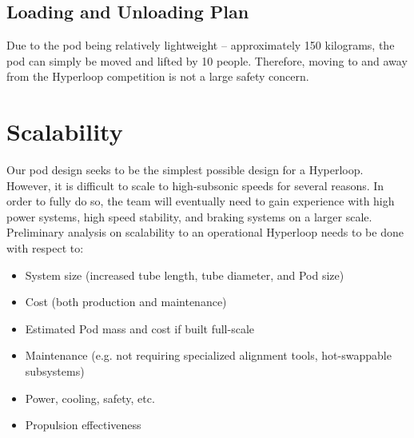 \documentclass[main.tex]{subfiles}
\begin{document}
\subsection{Loading and Unloading Plan}
Due to the pod being relatively lightweight – approximately 150 kilograms, the pod can simply be moved and lifted by 10 people. Therefore, moving to and away from the Hyperloop competition is not a large safety concern.
\section{Scalability}
Our pod design seeks to be the simplest possible design for a Hyperloop. However, it is difficult to scale to high-subsonic speeds for several reasons.
In order to fully do so, the team will eventually need to gain experience with high power systems, high speed stability, and braking systems on a larger scale.\\
Preliminary analysis on scalability to an operational Hyperloop needs to be done with respect to:
\begin{itemize}
    \item System size (increased tube length, tube diameter, and Pod size)

    \item Cost (both production and maintenance)
    \item Estimated Pod mass and cost if built full-scale
    \item Maintenance (e.g. not requiring specialized alignment tools, hot-swappable subsystems)
    \item Power, cooling, safety, etc.

    \item Propulsion effectiveness

\end{itemize}
\end{document}
